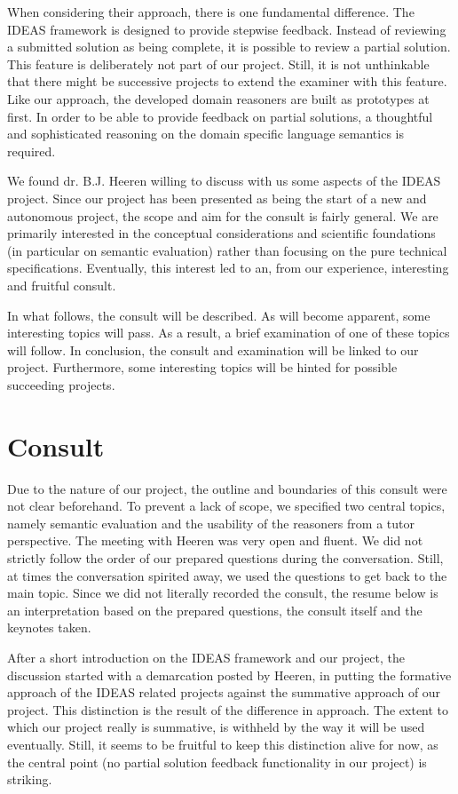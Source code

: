 When considering their approach, there is one fundamental difference. The IDEAS
framework is designed to provide stepwise feedback. Instead of reviewing a
submitted solution as being complete, it is possible to review a partial 
solution. This feature is deliberately not part of our project. Still, it is 
not unthinkable that there might be successive projects to extend the 
\gls{examiner} with this feature. Like our approach, the developed domain 
reasoners are built as prototypes at first. In order to be able to provide 
feedback on partial solutions, a thoughtful and sophisticated reasoning on the 
domain specific language semantics is required.


We found dr. B.J. Heeren willing to discuss with us some aspects of the IDEAS 
project. Since our project has been presented as being the start of a new and 
autonomous project, the scope and aim for the consult is fairly general. 
We are primarily interested in the conceptual considerations and scientific 
foundations (in particular on semantic evaluation) rather than focusing on the 
pure technical specifications. Eventually, this interest led to an, from our 
experience, interesting and fruitful consult. 


In what follows, the consult will be described. As will become apparent, some 
interesting topics will pass. As a result, a brief examination of one of these 
topics will follow. In conclusion, the consult and examination will be linked 
to our project. Furthermore, some interesting topics will be hinted for 
possible succeeding projects.


\section{Consult}
Due to the nature of our project, the outline and boundaries of this consult 
were not clear beforehand. To prevent a lack of scope, we specified two 
central topics, namely semantic evaluation and the usability of the reasoners 
from a tutor perspective. The meeting with Heeren was very open and fluent. We 
did not strictly follow the order of our prepared questions during the 
conversation. Still, at times the 
conversation spirited away, we used the questions to get back to the main 
topic. Since we did not literally recorded the consult, the resume below is an 
interpretation based on the prepared questions, the consult itself and the 
keynotes taken.

After a short introduction on the IDEAS framework and our project, the 
discussion started with a demarcation posted by Heeren, in putting the 
formative approach of the IDEAS related projects against the summative 
approach of our project. This distinction is the result of the difference in 
approach. The extent to which our project really is summative, is withheld by 
the way it will be used eventually. %
Still, it seems to be fruitful to keep this distinction alive for now, as the 
central point (no partial solution feedback functionality in our project) is 
striking. 


